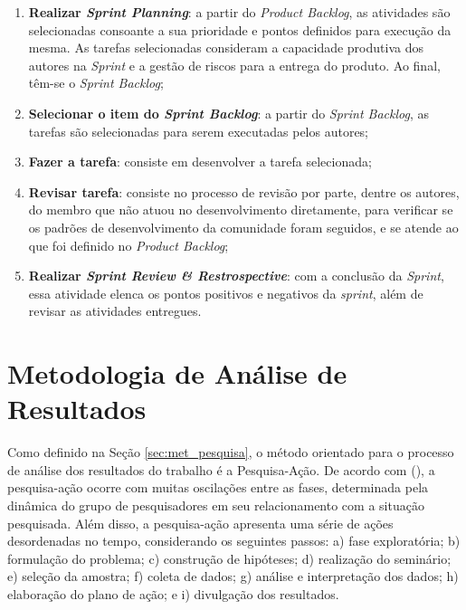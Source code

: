 \begin{enumerate}
    \item \textbf{Realizar \textit{Sprint Planning}}: a partir do \textit{Product Backlog}, as atividades são selecionadas consoante a sua prioridade e pontos definidos para execução da mesma. As tarefas selecionadas consideram a capacidade produtiva dos autores na \textit{Sprint} e a gestão de riscos para a entrega do produto. Ao final, têm-se o \textit{Sprint Backlog};
    \item \textbf{Selecionar o item do \textit{Sprint Backlog}}: a partir do \textit{Sprint Backlog}, as tarefas são selecionadas para serem executadas pelos autores;
    \item \textbf{Fazer a tarefa}: consiste em desenvolver a tarefa selecionada;
    \item \textbf{Revisar tarefa}: consiste no processo de revisão por parte, dentre os autores, do membro que não atuou no desenvolvimento diretamente, para verificar se os padrões de desenvolvimento da comunidade foram seguidos, e se atende ao que foi definido no \textit{Product Backlog};
    \item \textbf{Realizar \textit{Sprint Review \& Restrospective}}: com a conclusão da \textit{Sprint}, essa atividade elenca os pontos positivos e negativos da \textit{sprint}, além de revisar as atividades entregues.
\end{enumerate}


\section{Metodologia de Análise de Resultados}

\label{sec:meto_analise_resultado}

Como definido na Seção \ref{sec:met_pesquisa}, o método orientado para o processo de análise dos resultados do trabalho é a Pesquisa-Ação. De acordo com  (\citeyear{gil2002elaborar}), a pesquisa-ação ocorre com muitas oscilações entre as fases, determinada pela dinâmica do grupo de pesquisadores em seu relacionamento com a situação pesquisada. Além disso, a pesquisa-ação apresenta uma série de ações desordenadas no tempo, considerando os seguintes passos: a) fase exploratória; b) formulação do problema; c) construção de hipóteses; d) realização do seminário; e) seleção da amostra; f) coleta de dados; g) análise e interpretação dos dados; h) elaboração do plano de ação; e i) divulgação dos resultados.

